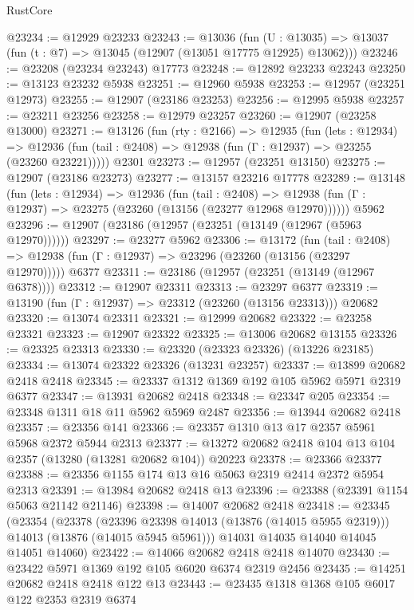 \begin{lexlean}{RustCore}
\begin{coremodule}
@23234 := @12929 @23233
@23243 := @13036
    (fun (U : @13035) => @13037 (fun (t : @7) => @13045 (@12907 (@13051 @17775 @12925) @13062)))
@23246 := @23208 (@23234 @23243) @17773
@23248 := @12892 @23233 @23243
@23250 := @13123 @23232 @5938
@23251 := @12960 @5938
@23253 := @12957 (@23251 @12973)
@23255 := @12907 (@23186 @23253)
@23256 := @12995 @5938
@23257 := @23211 @23256
@23258 := @12979 @23257
@23260 := @12907 (@23258 @13000)
@23271 := @13126
    (fun (rty : @2166) =>
    @12935
      (fun (lets : @12934) =>
      @12936 (fun (tail : @2408) => @12938 (fun (Γ : @12937) => @23255 (@23260 @23221)))))
    @2301
@23273 := @12957 (@23251 @13150)
@23275 := @12907 (@23186 @23273)
@23277 := @13157 @23216 @17778
@23289 := @13148
    (fun (lets : @12934) =>
    @12936
      (fun (tail : @2408) =>
      @12938 (fun (Γ : @12937) => @23275 (@23260 (@13156 (@23277 @12968 @12970))))))
    @5962
@23296 := @12907 (@23186 (@12957 (@23251 (@13149 (@12967 (@5963 @12970))))))
@23297 := @23277 @5962
@23306 := @13172
    (fun (tail : @2408) => @12938 (fun (Γ : @12937) => @23296 (@23260 (@13156 (@23297 @12970)))))
    @6377
@23311 := @23186 (@12957 (@23251 (@13149 (@12967 @6378))))
@23312 := @12907 @23311
@23313 := @23297 @6377
@23319 := @13190 (fun (Γ : @12937) => @23312 (@23260 (@13156 @23313))) @20682
@23320 := @13074 @23311
@23321 := @12999 @20682
@23322 := @23258 @23321
@23323 := @12907 @23322
@23325 := @13006 @20682 @13155
@23326 := @23325 @23313
@23330 := @23320 (@23323 @23326) (@13226 @23185)
@23334 := @13074 @23322 @23326 (@13231 @23257)
@23337 := @13899 @20682 @2418 @2418
@23345 := @23337 @1312 @1369 @192 @105 @5962 @5971 @2319 @6377
@23347 := @13931 @20682 @2418
@23348 := @23347 @205
@23354 := @23348 @1311 @18 @11 @5962 @5969 @2487
@23356 := @13944 @20682 @2418
@23357 := @23356 @141
@23366 := @23357 @1310 @13 @17 @2357 @5961 @5968 @2372 @5944 @2313
@23377 := @13272 @20682 @2418 @104 @13 @104 @2357 (@13280 (@13281 @20682 @104)) @20223
@23378 := @23366 @23377
@23388 := @23356 @1155 @174 @13 @16 @5063 @2319 @2414 @2372 @5954 @2313
@23391 := @13984 @20682 @2418 @13
@23396 := @23388 (@23391 @1154 @5063 @21142 @21146)
@23398 := @14007 @20682 @2418
@23418 := @23345
    (@23354
      (@23378
        (@23396 @23398 @14013 (@13876 (@14015 @5955 @2319)))
        @14013
        (@13876 (@14015 @5945 @5961)))
      @14031
      @14035
      @14040
      @14045
      @14051
      @14060)
@23422 := @14066 @20682 @2418 @2418 @14070
@23430 := @23422 @5971 @1369 @192 @105 @6020 @6374 @2319 @2456
@23435 := @14251 @20682 @2418 @2418 @122 @13
@23443 := @23435 @1318 @1368 @105 @6017 @122 @2353 @2319 @6374

\end{coremodule}
\end{lexlean}
